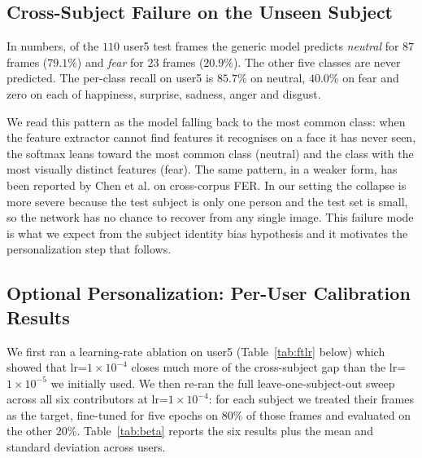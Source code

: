 \documentclass[12pt,a4paper]{article}
\begin{document}
\subsection{Cross-Subject Failure on the Unseen Subject}
\label{sec:results:failure}

In numbers, of the $110$ user5 test frames the generic model
predicts \emph{neutral} for $87$ frames ($79.1\%$) and
\emph{fear} for $23$ frames ($20.9\%$). The other five classes
are never predicted. The per-class recall on user5 is
$85.7\%$ on neutral, $40.0\%$ on fear and zero on each of
happiness, surprise, sadness, anger and disgust.

We read this pattern as the model falling back to the most
common class: when the feature extractor cannot find features
it recognises on a face it has never seen, the softmax leans
toward the most common class (neutral) and the class with the
most visually distinct features (fear). The same pattern, in a
weaker form, has been reported by Chen et al.
\autocite{chen2021agra} on cross-corpus FER. In our setting the
collapse is more severe because the test subject is only one
person and the test set is small, so the network has no chance
to recover from any single image. This failure mode is what we
expect from the subject identity bias hypothesis and it
motivates the personalization step that follows.

\subsection{Optional Personalization: Per-User Calibration Results}
\label{sec:results:personalize}

We first ran a learning-rate ablation on user5
(Table~\ref{tab:ftlr} below) which showed that
lr=$1\times 10^{-4}$ closes much more of the cross-subject
gap than the lr=$1\times 10^{-5}$ we initially used. We then
re-ran the full leave-one-subject-out sweep across all six
contributors at lr=$1\times 10^{-4}$: for each subject we
treated their frames as the target, fine-tuned for five
epochs on $80\%$ of those frames and evaluated on the other
$20\%$. Table~\ref{tab:beta} reports the six results plus
the mean and standard deviation across users.
\end{document}
